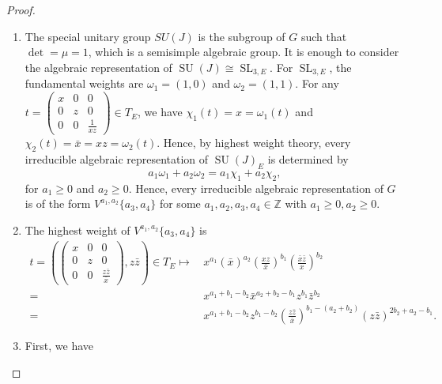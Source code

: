 \documentclass[11pt, a4paper]{amsart}
\theoremstyle{plain}
\theoremstyle{definition}
\numberwithin{equation}{section}
\DeclareMathOperator{\SL}{\mathrm{SL}}
\DeclareMathOperator{\SU}{\mathrm{SU}}
\begin{document}
\begin{proof}
  \begin{enumerate}
      \item The special unitary group $SU(J)$ is the subgroup of $G$ such that $\det = \mu = 1$, which is a semisimple algebraic group. It is enough to consider the algebraic representation of $\SU(J) \cong \SL_{3, E}$. For $\SL_{3, E}$, the fundamental weights are $\omega_1 = (1, 0)$ and  $\omega_2 = (1, 1)$. 
      For any $t = \begin{pmatrix} 
                             x & 0 & 0 \\
                             0 & z & 0 \\
                             0 & 0 & \frac{1}{xz}
                          \end{pmatrix}  \in T_{E}$, we have $\chi_1(t) = x = \omega_1(t)$ and $\chi_2(t) = \bar{x} = xz = \omega_2(t)$. 
        Hence, by highest weight theory, every irreducible algebraic representation of $\SU(J)_{E}$ is determined by 
        \begin{equation*}
            a_1 \omega_1 + a_2 \omega_2 = a_1 \chi_1 + a_2 \chi_2,
        \end{equation*}
        for $a_1 \ge 0$ and $a_2 \ge 0$. Hence, every irreducible algebraic representation of $G$ is of the form $V^{a_1,a_2}\{a_3,a_4\}$ for some $a_1, a_2, a_3, a_4 \in \mathbb{Z}$ with $a_1 \ge 0, a_2 \ge 0$.
      \item The highest weight of $V^{a_1,a_2}\{a_3,a_4\}$ is 
            \begin{align*}
                t = \left( \begin{pmatrix} 
                             x & 0 & 0 \\
                             0 & z & 0 \\
                             0 & 0 & \frac{z\bar{z}}{\bar{x}}
                          \end{pmatrix}, z\bar{z}\right) \in T_{E} \mapsto \, &x^{a_1} (\bar{x})^{a_2}  (\frac{xz}{\bar{x}})^{b_1}(\frac{\bar{x}\bar{z}}{x})^{b_2} \\
                          = &x^{a_1 + b_1 - b_2}\bar{x}^{a_2 + b_2 - b_1}z^{b_1} \bar{z}^{b_2} \\
                          = & x^{a_1 + b_1 - b_2} z^{b_1 - b_2} (\frac{z \bar{z}}{\bar{x}})^{b_1 - (a_2 + b_2)}(z\bar{z})^{2b_2 + a_2 - b_1}. 
            \end{align*}
      \item First, we have 

\end{enumerate}
\end{proof}
\end{document}
